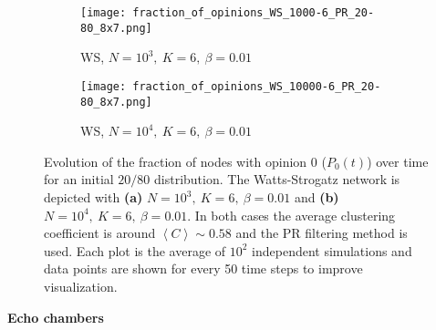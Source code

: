 \documentclass[11 pt , letterpaper , twoside , openright]{book}
\begin{document}
\begin{figure}[H]
  \begin{subfigure}[b]{0.49\textwidth}
  	\texttt{[image: fraction\_of\_opinions\_WS\_1000-6\_PR\_20-80\_8x7.png]}
    \caption{WS, $N = 10^3,\ K=6,\ \beta=0.01$}
    \label{ws1000}
  \end{subfigure}
  \begin{subfigure}[b]{0.49\textwidth}
  	\texttt{[image: fraction\_of\_opinions\_WS\_10000-6\_PR\_20-80\_8x7.png]}
    \caption{WS, $N = 10^4,\ K=6,\ \beta=0.01$}
    \label{ws10000}
  \end{subfigure}
  \captionsetup{format=plain}
  \caption[Evolution of the fraction of nodes with opinion 0 ($P_0(t)$) over time for an initial $20/80$ opinion distribution for a WS model with $N=10^3$ or $N=10^4$, $K=6$ and $\beta = 0.01$, PR.]{Evolution of the fraction of nodes with opinion 0 ($P_0(t)$) over time for an initial $20/80$ distribution. The Watts-Strogatz network is depicted with \textbf{(a)} $N=10^3,\ K=6,\ \beta=0.01$ and \textbf{(b)} $N=10^4,\ K=6,\ \beta=0.01$. In both cases the average clustering coefficient is around $\left<C\right> \sim 0.58$ and the PR filtering method is used. Each plot is the average of $10^2$ independent simulations and data points are shown for every 50 time steps to improve visualization.}
\label{ev_op_WS_k=6}
\end{figure}
\newpage
\noindent
\textbf{Echo chambers}\\
\end{document}
